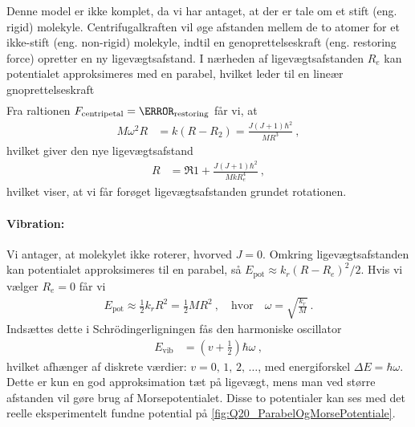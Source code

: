 Denne model er ikke komplet, da vi har antaget, at der er tale om et stift (eng. rigid) molekyle. Centrifugalkraften vil øge afstanden mellem de to atomer for et ikke-stift (eng. non-rigid) molekyle, indtil en genoprettelseskraft (eng. restoring force) opretter en ny ligevægtsafstand. I nærheden af ligevægtsafstanden $R_e$ kan potentialet approksimeres med en parabel, hvilket leder til en lineær gnoprettelseskraft
\begin{align}
    
\end{align}
Fra raltionen $F_\text{centripetal} = \F_\text{restoring}$ får vi, at
\begin{align}
    M\omega^2 R &= k(R - R_2) = \frac{J(J+1)\hbar^2}{MR^3} \: ,
\end{align}
hvilket giver den nye ligevægtsafstand
\begin{align}
    R &= \Re{1 + \frac{J(J+1)\hbar^2}{Mk R_e^4}} \: ,
\end{align}
hvilket viser, at vi får forøget ligevægtsafstanden grundet rotationen.


\paragraph{Vibration:} Vi antager, at molekylet ikke roterer, hvorved $J = 0$. Omkring ligevægtsafstanden kan potentialet approksimeres til en parabel, så $E_\text{pot} \approx k_r (R-R_e)^2 / 2$. Hvis vi vælger $R_e = 0$ får vi
\begin{align}
    E_\text{pot} \approx \frac{1}{2}k_rR^2 = \frac{1}{2}MR^2 \: , \quad \text{hvor} \quad \omega = \sqrt{\frac{k_r}{M}} \: .
\end{align}
Indsættes dette i Schrödingerligningen fås den harmoniske oscillator
\begin{align}
    E_\text{vib} &= \left(v + \frac{1}{2}\right)\hbar\omega \: ,
\end{align}
hvilket afhænger af diskrete værdier: $v = 0,\, 1,\, 2, \, \ldots$, med energiforskel $\Delta E = \hbar\omega$. Dette er kun en god approksimation tæt på ligevægt, mens man ved større afstanden vil gøre brug af \textsf{Morsepotentialet}. Disse to potentialer kan ses med det reelle eksperimentelt fundne potential på \cref{fig:Q20_ParabelOgMorsePotentiale}.

